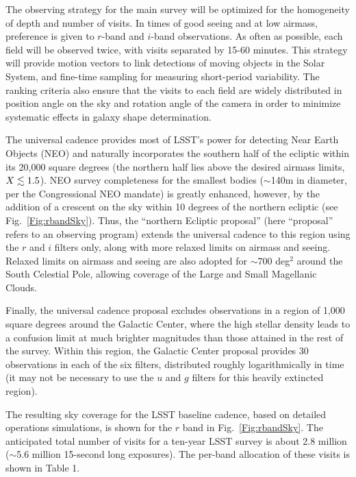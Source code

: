\documentclass{emulateapj}
\begin{document}
The observing strategy for the main survey will be optimized for the homogeneity
of depth and number of visits. In times of good seeing and at low airmass, preference 
is given to $r$-band and $i$-band observations. As often as possible, each field will be 
observed twice, with visits separated by 15-60 minutes. This strategy will provide motion 
vectors to link detections of moving objects in the Solar System, and fine-time sampling 
for measuring short-period variability. The ranking criteria also ensure that the 
visits to each field are widely distributed in position angle on the sky and 
rotation angle of the camera in order to minimize systematic effects in galaxy shape 
determination.

The universal cadence provides most of LSST's power for detecting Near Earth 
Objects (NEO) and naturally incorporates the southern half of the ecliptic 
within its 20,000 square degrees (the northern half lies above the desired airmass 
limits, $X\lesssim1.5$). NEO survey completeness for the smallest bodies ($\sim$140m in 
diameter, per the Congressional NEO mandate) is greatly enhanced, however, by the 
addition of a crescent on the sky within 10 degrees of the northern ecliptic
(see Fig.~\ref{Fig:rbandSky}). Thus, the ``northern Ecliptic proposal'' (here ``proposal''
refers to an observing program) extends the universal cadence to this region using the
$r$ and $i$ filters only, along 
with more relaxed limits on airmass and seeing. Relaxed limits on airmass and 
seeing are also adopted for $\sim$700 deg$^2$ around the South Celestial 
Pole, allowing coverage of the Large and Small Magellanic Clouds.

Finally, the universal cadence proposal excludes observations in a region of 
1,000 square degrees around the Galactic Center, where the high stellar
density leads to a confusion limit at much brighter magnitudes than those 
attained in the rest of the survey. Within this region, the Galactic Center
proposal provides 30 observations in each of the six filters, distributed 
roughly logarithmically in time (it may not be necessary to use the
$u$ and $g$ filters for this heavily extincted region). 

The resulting sky coverage for the LSST baseline
cadence, based on detailed operations simulations, is shown for the 
$r$ band in Fig.~\ref{Fig:rbandSky}. The anticipated total number of visits 
for a ten-year LSST survey is about 2.8 million ($\sim$5.6 million 15-second long
exposures). The per-band allocation of these visits is shown in Table 1.
\end{document}
